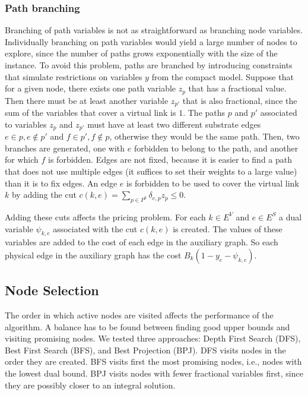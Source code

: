 \documentclass[conference]{IEEEtran}
\begin{document}
\subsubsection{Path branching}
Branching of path variables is not as straightforward as branching node variables. 
Individually branching on path variables would yield a large number of nodes to explore, since the number of paths grows exponentially with the size of the instance. 
To avoid this problem, paths are branched by introducing constraints that simulate restrictions on variables $y$ from the compact model. 
Suppose that for a given node, there exists one path variable $z_{p}$ that has a fractional value. Then there must be at least another variable $z_{p'}$ that is also fractional, since the sum of the variables that cover a virtual link is $1$. 
The paths $p$ and $p'$ associated to variables $z_{p}$ and $z_{p'}$ must have at least two different substrate edges $e \in p, e \notin p'$ and $f \in p', f \notin p$, otherwise they would be the same path. Then, two branches are generated, one with $e$ forbidden to belong to the path, and another for which $f$ is forbidden. Edges are not fixed, because it is easier to find a path that does not use multiple edges (it suffices to set their weights to a large value) than it is to fix edges. An edge $e$ is forbidden to be used to cover the virtual link $k$ by adding the cut $c(k,e) = \sum\limits_{p \in P^k} \delta_{e,p} z_p \leq 0$.

Adding these cuts affects the pricing problem. For each $k \in E^V$ and $e \in E^S$ a dual variable $\psi_{k,e}$ associated with the cut $c(k,e)$ is created. The values of these variables are added to the cost of each edge in the auxiliary graph. So each physical edge in the auxiliary graph has the cost $B_{k}(1 - y_{e} - \psi_{k,e})$.

\subsection{Node Selection}
\label{sec:nodesel}
The order in which active nodes are visited affects the performance of the algorithm. A balance has to be found between finding good upper bounds and visiting promising nodes. We tested three approaches: Depth First Search (DFS), Best First Search (BFS), and Best Projection (BPJ). DFS visits nodes in the order they are created. BFS visits first the most promising nodes, i.e., nodes with the lowest dual bound. BPJ visits nodes with fewer fractional variables first, since they are possibly closer to an integral solution.
\end{document}
